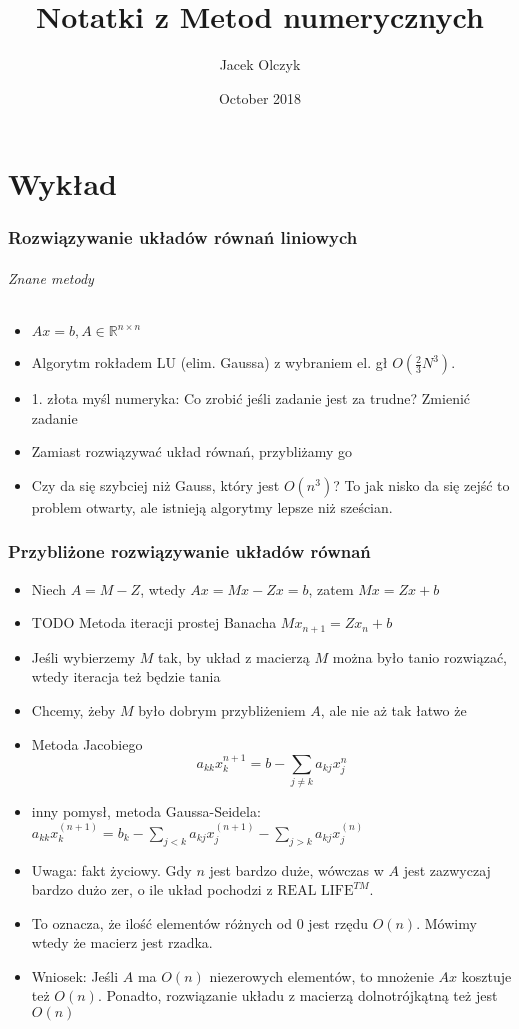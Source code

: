 \documentclass{article}
\title{Notatki z Metod numerycznych }
\author{Jacek Olczyk}
\date{October 2018}
\begin{document}
	\maketitle
	\part{Wykład}
	\section{Rozwiązywanie układów równań liniowych}
	\paragraph{Znane metody}
	\begin{itemize}
		\item $Ax=b, A\in\mathbb R^{n\times n}$
		\item Algorytm rokładem LU (elim. Gaussa) z wybraniem el. gł $O(\frac{2}{3}N^3)$.
		\item 1. złota myśl numeryka: Co zrobić jeśli zadanie jest za trudne? Zmienić zadanie
		\item Zamiast rozwiązywać układ równań, przybliżamy go
		\item Czy da się szybciej niż Gauss, który jest $O(n^3)$? To jak nisko da się zejść to problem otwarty, ale istnieją algorytmy lepsze niż sześcian.
	\end{itemize}

\section{Przybliżone rozwiązywanie układów równań}
\begin{itemize}
	\item Niech $ A=M-Z $, wtedy $ Ax=Mx-Zx=b $, zatem $ Mx=Zx+b $
	\item TODO Metoda iteracji prostej Banacha $Mx_{n+1} = Zx_{n}+b$
	\item Jeśli wybierzemy $ M $ tak, by układ z macierzą $ M $ można było tanio rozwiązać, wtedy iteracja też będzie tania
	\item Chcemy, żeby $ M $ było dobrym przybliżeniem $ A $, ale nie aż tak łatwo że 
	\item Metoda Jacobiego $$a_{kk}x_{k}^{n+1}=b - \sum_{j\not=k} a_{kj}x_{j}^n$$
	\item inny pomysł, metoda Gaussa-Seidela: $a_{kk}x_k^{(n+1)} = b_k - \sum_{j<k}a_{kj}x_{j}^{(n+1)} - \sum_{j >k}a_{kj}x_{j}^{(n)}$
	\item Uwaga: fakt życiowy. Gdy $n$ jest bardzo duże, wówczas w $A$ jest zazwyczaj bardzo dużo zer, o ile układ pochodzi z $\text{REAL LIFE}^{TM}$. 
	\item To oznacza, że ilość elementów różnych od $0$ jest rzędu $O(n)$. Mówimy wtedy że macierz jest rzadka.
	\item Wniosek: Jeśli $ A $ ma $ O(n) $ niezerowych elementów, to mnożenie $Ax$ kosztuje też $ O(n) $. Ponadto, rozwiązanie układu z macierzą dolnotrójkątną też jest $ O(n) $
	
\end{itemize}
\end{document}
